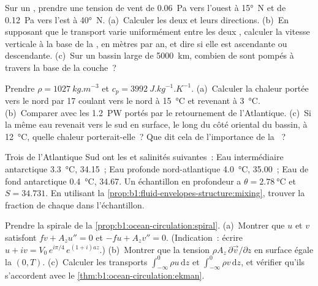 \begin{exercise}[$\star\star$]\label{exo:b1:ocean-circulation:7}
Sur un , prendre une tension de vent de \qty{0.06}{Pa} vers l'ouest à
\ang{15}~N et de \qty{0.12}{Pa} vers l'est à \ang{40}~N. (a)~Calculer les deux  et leurs directions. (b)~En supposant que le transport varie uniformément entre
les deux , calculer la vitesse verticale à la base de la , en
mètres par an, et dire si elle est ascendante ou descendante. (c)~Sur un bassin
large de \qty{5000}{km}, combien de  sont pompés à travers la base de la couche~?
\end{exercise}

\begin{exercise}[$\star\star$]\label{exo:b1:ocean-circulation:8}
Prendre $\rho = \qty{1027}{kg.m^{-3}}$ et $c_p = \qty{3992}{J.kg^{-1}.K^{-1}}$.
(a)~Calculer la chaleur portée vers le nord par \qty{17}{\sverdrup} coulant vers le nord à
\qty{15}{\celsius} et revenant à \qty{3}{\celsius}. (b)~Comparer avec les
\qty{1.2}{PW} portés par le retournement de l'Atlantique. (c)~Si la même eau revenait
vers le sud en surface, le long du côté oriental du bassin, à \qty{12}{\celsius},
quelle chaleur porterait-elle~? Que dit cela de l'importance de la ~?
\end{exercise}

\begin{exercise}[$\star\star$]\label{exo:b1:ocean-circulation:9}
Trois  de l'Atlantique Sud ont les  et
salinités suivantes~: Eau intermédiaire antarctique \qty{3.3}{\celsius}, 34.15~; Eau profonde
nord-atlantique \qty{4.0}{\celsius}, 35.00~; Eau de fond antarctique \qty{0.4}{\celsius},
34.67. Un échantillon en profondeur a $\theta = \qty{2.78}{\celsius}$ et $S = 34.731$.
En utilisant la \cref{prop:b1:fluid-envelopes-structure:mixing}, trouver la fraction de chaque
 dans l'échantillon.
\end{exercise}

\begin{exercise}[$\star\star\star$]\label{exo:b1:ocean-circulation:10}
Prendre la spirale de la \cref{prop:b1:ocean-circulation:spiral}. (a)~Montrer que $u$ et $v$
satisfont $f v + A_z u'' = 0$ et $-f u + A_z v'' = 0$. (Indication~: écrire $u + iv =
V_0\,e^{i\pi/4}\,e^{(1+i)az}$.) (b)~Montrer que la tension $\rho A_z\,\partial\vec
v/\partial z$ en surface égale la  $(0, T)$. (c)~Calculer les
transports $\int_{-\infty}^0 \rho u\,\mathrm dz$ et $\int_{-\infty}^0 \rho
v\,\mathrm dz$, et vérifier qu'ils s'accordent avec le
\cref{thm:b1:ocean-circulation:ekman}.
\end{exercise}

